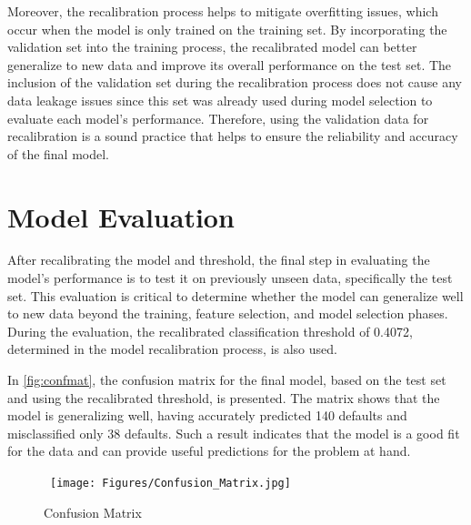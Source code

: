 Moreover, the recalibration process helps to mitigate overfitting issues, which occur when the model is only trained on the training set.
By incorporating the validation set into the training process, the recalibrated model can better generalize to new data and improve its overall performance on the test set.
The inclusion of the validation set during the recalibration process does not cause any data leakage issues since this set was already used during model selection to evaluate each model's performance.
Therefore, using the validation data for recalibration is a sound practice that helps to ensure the reliability and accuracy of the final model.

\section{Model Evaluation}

After recalibrating the model and threshold, the final step in evaluating the model's performance is to test it on previously unseen data, specifically the test set.
This evaluation is critical to determine whether the model can generalize well to new data beyond the training, feature selection, and model selection phases.
During the evaluation, the recalibrated classification threshold of 0.4072, determined in the model recalibration process, is also used.

In \autoref{fig:confmat}, the confusion matrix for the final model, based on the test set and using the recalibrated threshold, is presented. The matrix shows that the model is generalizing well, having accurately predicted 140 defaults and misclassified only 38 defaults. Such a result indicates that the model is a good fit for the data and can provide useful predictions for the problem at hand.

\begin{figure}[H]
    \centering
    \caption{Confusion Matrix}\vspace{0.5em}
    \label{fig:confmat}\
    \texttt{[image: Figures/Confusion\_Matrix.jpg]}
    \vspace{-1em}
\end{figure}

